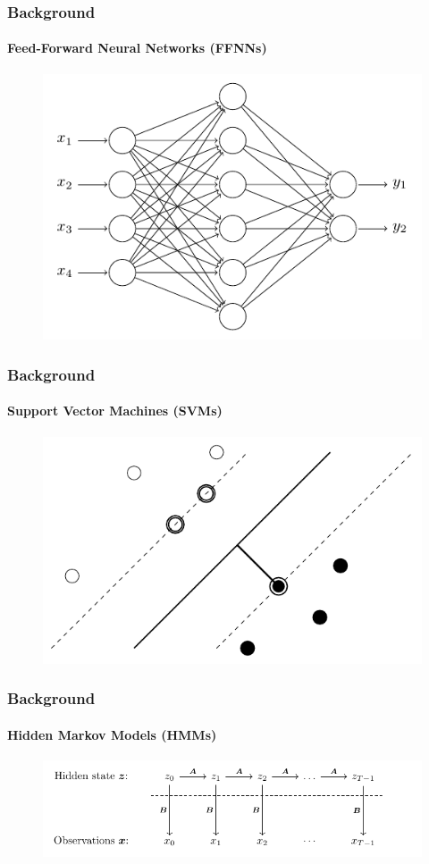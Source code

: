 \documentclass[xcolor={svgnames,table},10pt,fleqn]{beamer}
\begin{document}
\begin{frame}
    \frametitle{Background}
    \framesubtitle{Feed-Forward Neural Networks (FFNNs)}
    \begin{figure}
        \includegraphics{imgs/neural_network.pdf}
    \end{figure}
\end{frame}

\begin{frame}
    \frametitle{Background}
    \framesubtitle{Support Vector Machines (SVMs)}
    \begin{figure}
        \includegraphics{imgs/support_vector_machines.pdf}
    \end{figure}
\end{frame}

\begin{frame}
    \frametitle{Background}
    \framesubtitle{Hidden Markov Models (HMMs)}
    \begin{figure}
        \includegraphics[width=\textwidth]{imgs/hidden_markov_model.pdf}
    \end{figure}
\end{frame}
\end{document}
